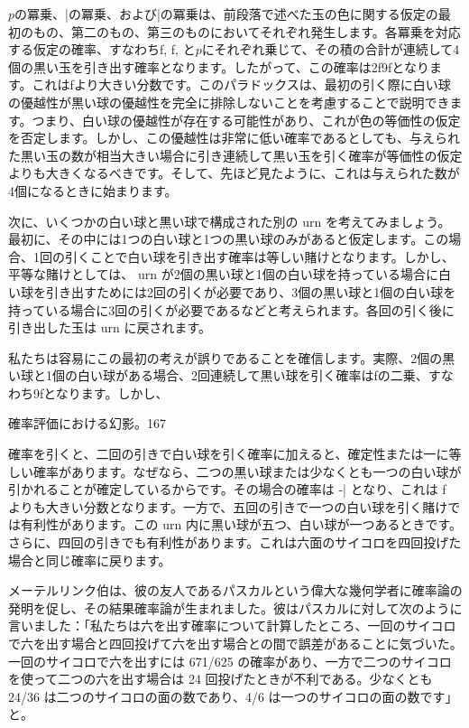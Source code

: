 \documentclass[a4paper,11pt,openany]{ltjsbook}
\begin{document}
$p$の冪乗、|の冪乗、および|の冪乗は、前段落で述べた玉の色に関する仮定の最初のもの、第二のもの、第三のものにおいてそれぞれ発生します。各冪乗を対応する仮定の確率、すなわちf, f, と$p$にそれぞれ乗じて、その積の合計が連続して4個の黒い玉を引き出す確率となります。したがって、この確率は2f9fとなります。これはfより大きい分数です。このパラドックスは、最初の引く際に白い球の優越性が黒い球の優越性を完全に排除しないことを考慮することで説明できます。つまり、白い球の優越性が存在する可能性があり、これが色の等価性の仮定を否定します。しかし、この優越性は非常に低い確率であるとしても、与えられた黒い玉の数が相当大きい場合に引き連続して黒い玉を引く確率が等価性の仮定よりも大きくなるべきです。そして、先ほど見たように、これは与えられた数が4個になるときに始まります。

次に、いくつかの白い球と黒い球で構成された別の urn を考えてみましょう。最初に、その中には1つの白い球と1つの黒い球のみがあると仮定します。この場合、1回の引くことで白い球を引き出す確率は等しい賭けとなります。しかし、平等な賭けとしては、 urn が2個の黒い球と1個の白い球を持っている場合に白い球を引き出すためには2回の引くが必要であり、3個の黒い球と1個の白い球を持っている場合に3回の引くが必要であるなどと考えられます。各回の引く後に引き出した玉は urn に戻されます。

私たちは容易にこの最初の考えが誤りであることを確信します。実際、2個の黒い球と1個の白い球がある場合、2回連続して黒い球を引く確率はfの二乗、すなわち9fとなります。しかし、

確率評価における幻影。167

確率を引くと、二回の引きで白い球を引く確率に加えると、確定性または一に等しい確率があります。なぜなら、二つの黒い球または少なくとも一つの白い球が引かれることが確定しているからです。その場合の確率は -| となり、これは f よりも大きい分数となります。一方で、五回の引きで一つの白い球を引く賭けでは有利性があります。この urn 内に黒い球が五つ、白い球が一つあるときです。さらに、四回の引きでも有利性があります。これは六面のサイコロを四回投げた場合と同じ確率に戻ります。

メーテルリンク伯は、彼の友人であるパスカルという偉大な幾何学者に確率論の発明を促し、その結果確率論が生まれました。彼はパスカルに対して次のように言いました：「私たちは六を出す確率について計算したところ、一回のサイコロで六を出す場合と四回投げて六を出す場合との間で誤差があることに気づいた。一回のサイコロで六を出すには 671/625 の確率があり、一方で二つのサイコロを使って二つの六を出す場合は 24 回投げたときが不利である。少なくとも 24/36 は二つのサイコロの面の数であり、4/6 は一つのサイコロの面の数です」と。
\end{document}
